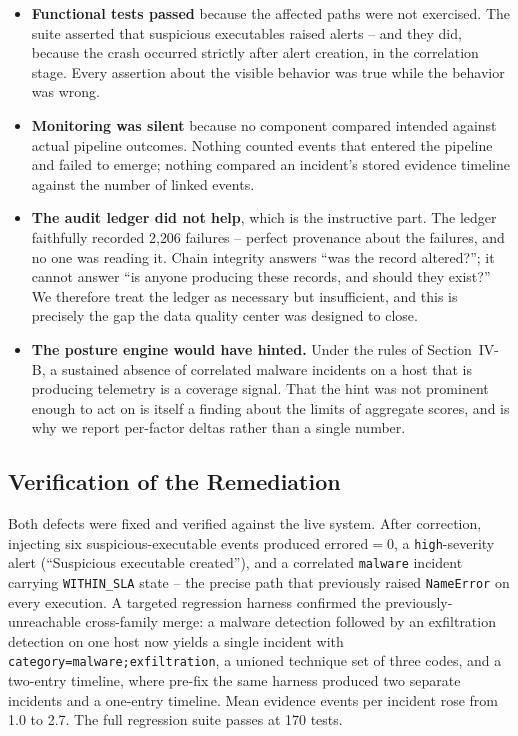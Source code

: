 \documentclass[conference]{IEEEtran}
\begin{document}
\begin{itemize}
\item \textbf{Functional tests passed} because the affected paths were not
      exercised. The suite asserted that suspicious executables raised
      alerts -- and they did, because the crash occurred strictly after alert
      creation, in the correlation stage. Every assertion about the visible
      behavior was true while the behavior was wrong.
\item \textbf{Monitoring was silent} because no component compared
      intended against actual pipeline outcomes. Nothing counted events that
      entered the pipeline and failed to emerge; nothing compared an
      incident's stored evidence timeline against the number of linked events.
\item \textbf{The audit ledger did not help}, which is the instructive part.
      The ledger faithfully recorded 2{,}206 failures -- perfect provenance
      about the failures, and no one was reading it. Chain integrity answers
      ``was the record altered?''; it cannot answer ``is anyone producing
      these records, and should they exist?'' We therefore treat the ledger
      as necessary but insufficient, and this is precisely the gap the data
      quality center was designed to close.
\item \textbf{The posture engine would have hinted.} Under the rules of
      Section~IV-B, a sustained absence of correlated malware incidents on a
      host that is producing telemetry is a coverage signal. That the hint was
      not prominent enough to act on is itself a finding about the limits of
      aggregate scores, and is why we report per-factor deltas rather than a
      single number.
\end{itemize}

\subsection{Verification of the Remediation}

Both defects were fixed and verified against the live system. After
correction, injecting six suspicious-executable events produced
$\text{errored}{=}0$, a \texttt{high}-severity alert
(``Suspicious executable created''), and a correlated \texttt{malware}
incident carrying \texttt{WITHIN\_SLA} state -- the precise path that
previously raised \texttt{NameError} on every execution. A targeted
regression harness confirmed the previously-unreachable cross-family merge: a
malware detection followed by an exfiltration detection on one host now
yields a single incident with \texttt{category=malware;exfiltration}, a
unioned technique set of three codes, and a two-entry timeline, where
pre-fix the same harness produced two separate incidents and a one-entry
timeline. Mean evidence events per incident rose from 1.0 to 2.7. The full
regression suite passes at 170 tests.
\end{document}
